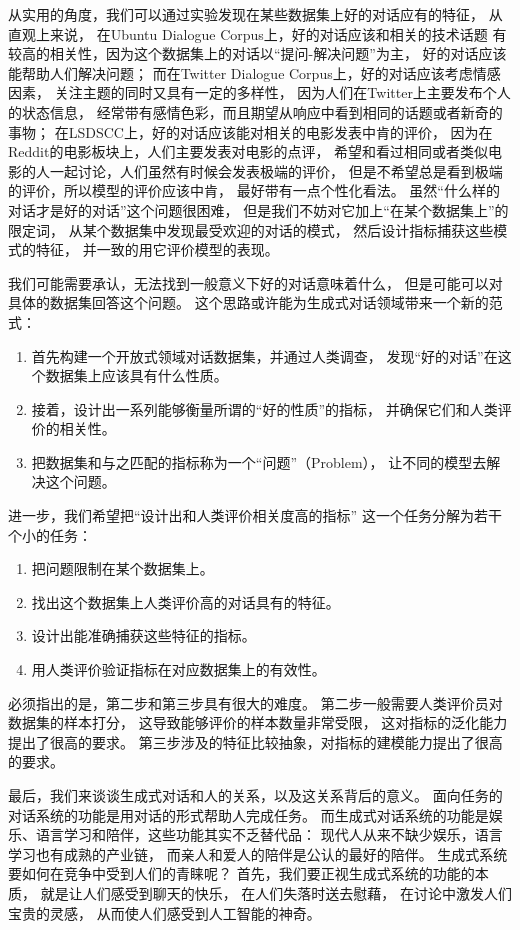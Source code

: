 从实用的角度，我们可以通过实验发现在某些数据集上好的对话应有的特征，
从直观上来说，
在Ubuntu Dialogue Corpus上，好的对话应该和相关的技术话题
有较高的相关性，因为这个数据集上的对话以“提问-解决问题”为主，
好的对话应该能帮助人们解决问题；
而在Twitter Dialogue Corpus上，好的对话应该考虑情感因素，
关注主题的同时又具有一定的多样性，
因为人们在Twitter上主要发布个人的状态信息，
经常带有感情色彩，而且期望从响应中看到相同的话题或者新奇的事物；
在LSDSCC上，好的对话应该能对相关的电影发表中肯的评价，
因为在Reddit的电影板块上，人们主要发表对电影的点评，
希望和看过相同或者类似电影的人一起讨论，人们虽然有时候会发表极端的评价，
但是不希望总是看到极端的评价，所以模型的评价应该中肯，
最好带有一点个性化看法。
虽然“什么样的对话才是好的对话”这个问题很困难，
但是我们不妨对它加上“在某个数据集上”的限定词，
从某个数据集中发现最受欢迎的对话的模式，
然后设计指标捕获这些模式的特征，
并一致的用它评价模型的表现。

我们可能需要承认，无法找到一般意义下好的对话意味着什么，
但是可能可以对具体的数据集回答这个问题。
这个思路或许能为生成式对话领域带来一个新的范式：
\begin{enumerate}
    \item 首先构建一个开放式领域对话数据集，并通过人类调查，
    发现“好的对话”在这个数据集上应该具有什么性质。
    \item 接着，设计出一系列能够衡量所谓的“好的性质”的指标，
    并确保它们和人类评价的相关性。
    \item 把数据集和与之匹配的指标称为一个“问题”（Problem），
    让不同的模型去解决这个问题。
\end{enumerate}

进一步，我们希望把“设计出和人类评价相关度高的指标”
这一个任务分解为若干个小的任务：
\begin{enumerate}
    \item 把问题限制在某个数据集上。
    \item 找出这个数据集上人类评价高的对话具有的特征。
    \item 设计出能准确捕获这些特征的指标。
    \item 用人类评价验证指标在对应数据集上的有效性。
\end{enumerate}

必须指出的是，第二步和第三步具有很大的难度。
第二步一般需要人类评价员对数据集的样本打分，
这导致能够评价的样本数量非常受限，
这对指标的泛化能力提出了很高的要求。
第三步涉及的特征比较抽象，对指标的建模能力提出了很高的要求。

最后，我们来谈谈生成式对话和人的关系，以及这关系背后的意义。
面向任务的对话系统的功能是用对话的形式帮助人完成任务。
而生成式对话系统的功能是娱乐、语言学习和陪伴，这些功能其实不乏替代品：
现代人从来不缺少娱乐，语言学习也有成熟的产业链，
而亲人和爱人的陪伴是公认的最好的陪伴。
生成式系统要如何在竞争中受到人们的青睐呢？
首先，我们要正视生成式系统的功能的本质，
就是让人们感受到聊天的快乐，
在人们失落时送去慰藉，
在讨论中激发人们宝贵的灵感，
从而使人们感受到人工智能的神奇。

